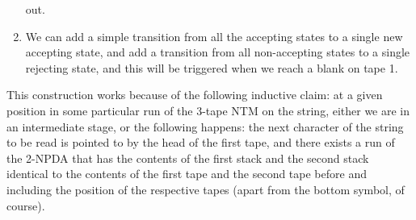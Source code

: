 \begin{soln}
\begin{enumerate}
            out.
        \item We can add a simple transition from all the accepting states to a single new accepting state, and add a transition from all non-accepting states to a single rejecting state,
            and this will be triggered when we reach a blank on tape 1.
    \end{enumerate}
    This construction works because of the following inductive claim: at a given position in some particular run of the 3-tape NTM on the string, either we are in an intermediate stage, or the following happens: the next character of the
    string to be read is pointed to by the head of the first tape, and there exists a run of the 2-NPDA that has the contents of the first stack and the second stack identical to the contents
    of the first tape and the second tape before and including the position of the respective tapes (apart from the bottom symbol, of course).

\end{soln}
